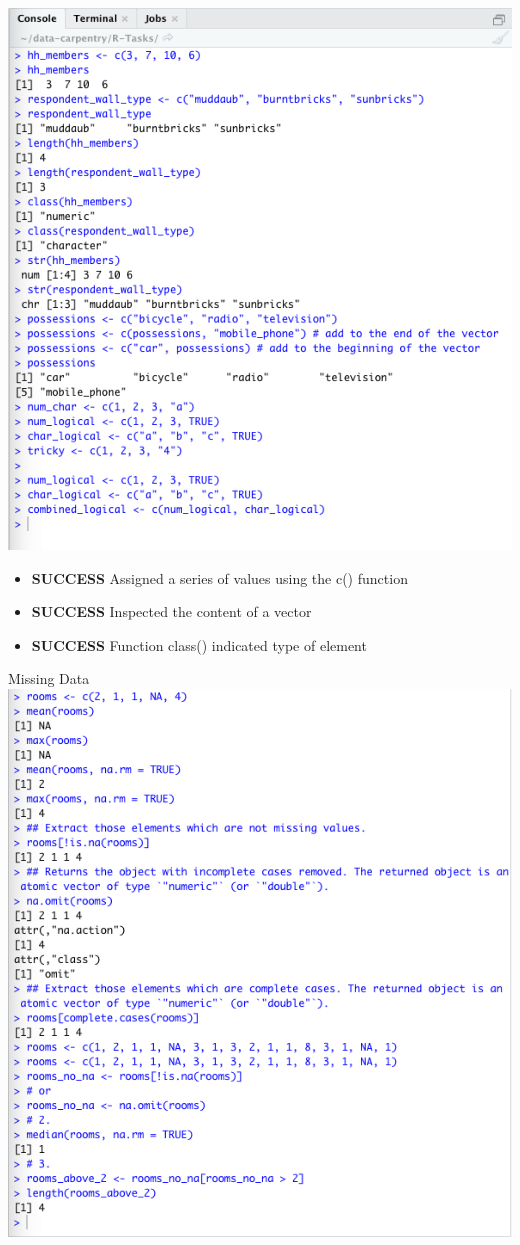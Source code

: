 \documentclass{article}
\begin{document}
\includegraphics[width=\textwidth]{Images/RStudio_6.png}
\begin{itemize}
\item \textbf{SUCCESS} Assigned a series of values using the c() function
\item \textbf{SUCCESS} Inspected the content of a vector 
\item \textbf{SUCCESS} Function class() indicated type of element
\end{itemize}
Missing Data \\
\includegraphics[width=\textwidth]{Images/RStudio_7.png} 
\end{document}
